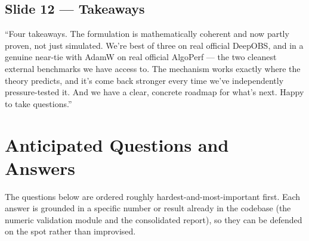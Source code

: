 \documentclass[11pt]{article}
\begin{document}
\subsection*{Slide 12 --- Takeaways}
``Four takeaways. The formulation is mathematically coherent and now partly proven, not just
simulated. We're best of three on real official DeepOBS, and in a genuine near-tie with AdamW on
real official AlgoPerf --- the two cleanest external benchmarks we have access to. The mechanism
works exactly where the theory predicts, and it's come back stronger every time we've
independently pressure-tested it. And we have a clear, concrete roadmap for what's next. Happy to
take questions.''

\clearpage
\section{Anticipated Questions and Answers}
\label{sec:qa}

\noindent The questions below are ordered roughly hardest-and-most-important first. Each answer
is grounded in a specific number or result already in the codebase (the numeric validation module
and the consolidated report), so they can be defended on the spot rather than improvised.
\end{document}
